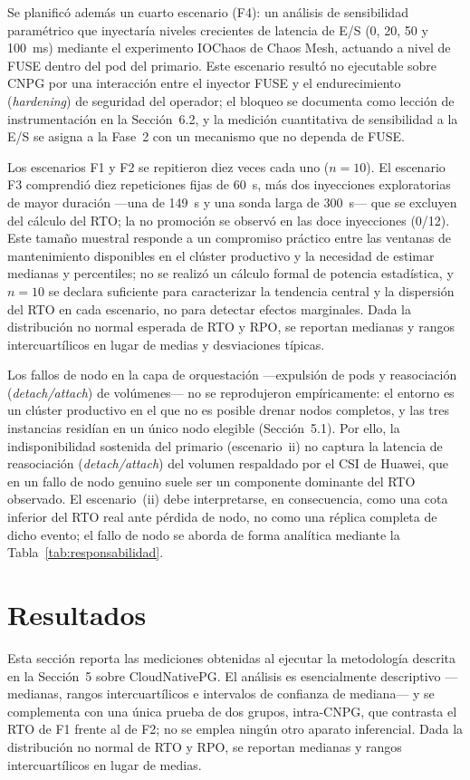 \documentclass[12pt,twocolumn,letterpaper]{article}
\begin{document}
Se planificó además un cuarto escenario (F4): un análisis de sensibilidad paramétrico que inyectaría niveles crecientes de latencia de E/S (0, 20, 50 y 100~ms) mediante el experimento IOChaos de Chaos Mesh, actuando a nivel de FUSE dentro del pod del primario. Este escenario resultó no ejecutable sobre CNPG por una interacción entre el inyector FUSE y el endurecimiento (\textit{hardening}) de seguridad del operador; el bloqueo se documenta como lección de instrumentación en la Sección~6.2, y la medición cuantitativa de sensibilidad a la E/S se asigna a la Fase~2 con un mecanismo que no dependa de FUSE.

Los escenarios F1 y F2 se repitieron diez veces cada uno ($n=10$). El escenario F3 comprendió diez repeticiones fijas de 60~s, más dos inyecciones exploratorias de mayor duración —una de 149~s y una sonda larga de 300~s— que se excluyen del cálculo del RTO; la no promoción se observó en las doce inyecciones (0/12). Este tamaño muestral responde a un compromiso práctico entre las ventanas de mantenimiento disponibles en el clúster productivo y la necesidad de estimar medianas y percentiles; no se realizó un cálculo formal de potencia estadística, y $n=10$ se declara suficiente para caracterizar la tendencia central y la dispersión del RTO en cada escenario, no para detectar efectos marginales. Dada la distribución no normal esperada de RTO y RPO, se reportan medianas y rangos intercuartílicos en lugar de medias y desviaciones típicas.

Los fallos de nodo en la capa de orquestación —expulsión de pods y reasociación (\textit{detach/attach}) de volúmenes— no se reprodujeron empíricamente: el entorno es un clúster productivo en el que no es posible drenar nodos completos, y las tres instancias residían en un único nodo elegible (Sección~5.1). Por ello, la indisponibilidad sostenida del primario (escenario~ii) no captura la latencia de reasociación (\textit{detach/attach}) del volumen respaldado por el CSI de Huawei, que en un fallo de nodo genuino suele ser un componente dominante del RTO observado. El escenario~(ii) debe interpretarse, en consecuencia, como una cota inferior del RTO real ante pérdida de nodo, no como una réplica completa de dicho evento; el fallo de nodo se aborda de forma analítica mediante la Tabla~\ref{tab:responsabilidad}.

\section{Resultados}
Esta sección reporta las mediciones obtenidas al ejecutar la metodología descrita en la Sección~5 sobre CloudNativePG. El análisis es esencialmente descriptivo —medianas, rangos intercuartílicos e intervalos de confianza de mediana— y se complementa con una única prueba de dos grupos, intra-CNPG, que contrasta el RTO de F1 frente al de F2; no se emplea ningún otro aparato inferencial. Dada la distribución no normal de RTO y RPO, se reportan medianas y rangos intercuartílicos en lugar de medias.
\end{document}
